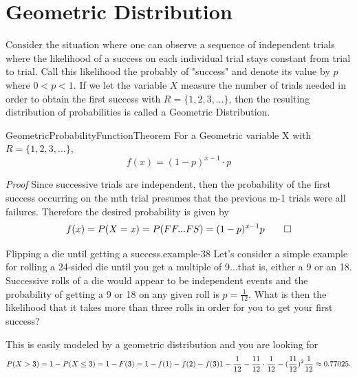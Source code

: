 \documentclass[10pt,]{book}
\makeatletter
\renewcommand*{\proofname}{Proof}
\renewenvironment{proof}[1][\proofname]{\par
  \pushQED{\qed}%
  \normalfont \topsep6\p@\@plus6\p@\relax
  \trivlist
  \item\relax
    {\itshape
    #1\@addpunct{.}}\hspace\labelsep\ignorespaces
}{%
  \popQED\endtrivlist\@endpefalse
}
\numberwithin{equation}{section}
\newcommand{\lt}{<}
\makeatother
\begin{document}
\section[{Geometric Distribution}]{Geometric Distribution}\label{section-47}
\hypertarget{p-939}{}%
Consider the situation where one can observe a sequence  of independent trials where the likelihood of a success on each individual trial stays constant from trial to trial. Call this likelihood the probably of "success" and denote its value by \(p\) where \(0 \lt p \lt 1 \). If we let the variable \(X\) measure the number of trials needed in order to obtain the first success with \(R = \{1, 2, 3, ... \}\), then the resulting distribution of probabilities is called a Geometric Distribution.%
\par
\hypertarget{p-940}{}%
\begin{theorem}{}{}{GeometricProbabilityFunctionTheorem}%
\hypertarget{GeometricProbabilityFunction}{}%
For a Geometric variable X with \(R = \{1, 2, 3, ... \}\),%
\begin{equation*}
f(x) = (1-p)^{x-1} \cdot p
\end{equation*}
%
\end{theorem}
\begin{proof}\hypertarget{proof-43}{}
\hypertarget{p-942}{}%
Since successive trials are independent, then the probability of the first success occurring on the mth trial presumes that the previous m-1 trials were all failures.  Therefore the desired probability is given by%
\begin{equation*}
f(x) = P(X = x) = P(FF...FS) = (1-p)^{x-1}p\qedhere
\end{equation*}
%
\end{proof}
%
\begin{example}{Flipping a die until getting a success.}{example-38}%
\hypertarget{p-943}{}%
Let's consider a simple example for rolling a 24-sided die until you get a multiple of 9...that is, either a 9 or an 18. Successive rolls of a die would appear to be independent events and the probability of getting a 9 or 18 on any given roll is \(p = \frac{1}{12}\). What is then the likelihood that it takes more than three rolls in order for you to get your first success?%
\par
\hypertarget{p-944}{}%
This is easily modeled by a geometric distribution and you are looking for%
\begin{equation*}
P(X > 3) = 1 - P(X \le 3) = 1 - F(3) = 1 - f(1) - f(2) - f(3) \\
1 - \frac{1}{12} - \frac{11}{12} \cdot \frac{1}{12} - (\frac{11}{12})^2 \frac{1}{12} \approx 0.77025.
\end{equation*}
%
\end{example}
\end{document}
